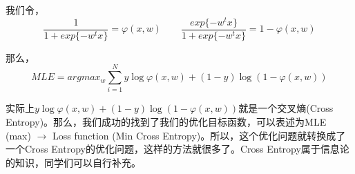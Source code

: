 \documentclass[a4paper]{article}
\begin{document}
我们令，
\begin{equation}
    \frac{1}{1+exp\{-w^tx\}}=\varphi(x,w) \qquad \frac{exp\{-w^tx\}}{1+exp\{-w^tx\}}=1-\varphi(x,w)
\end{equation}

那么，
\begin{equation}
    MLE =  argmax_w \sum_{i=1}^N y\log \varphi(x,w) + (1-y)\log (1-\varphi(x,w))
\end{equation}

实际上$y\log \varphi(x,w) + (1-y)\log (1-\varphi(x,w))$就是一个交叉熵(Cross Entropy)。那么，我们成功的找到了我们的优化目标函数，可以表述为MLE (max) $\longrightarrow$ Loss function (Min Cross Entropy)。所以，这个优化问题就转换成了一个Cross Entropy的优化问题，这样的方法就很多了。Cross Entropy属于信息论的知识，同学们可以自行补充。
\end{document}
